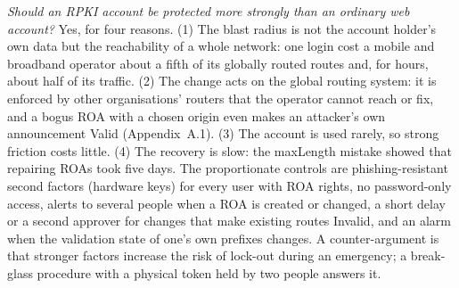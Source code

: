 \documentclass[11pt,a4paper]{article}
\begin{document}
\emph{Should an RPKI account be protected more strongly than an ordinary web account?} Yes, for four reasons. (1) The blast radius is not
the account holder's own data but the reachability of a whole network: one login cost a mobile and broadband operator about a fifth of its globally routed routes and, for hours, about half of its traffic. (2) The change acts on the global routing system: it is enforced by other organisations' routers that the operator cannot
reach or fix, and a bogus ROA with a chosen origin even makes an attacker's own announcement Valid (Appendix~A.1). (3) The account is used
rarely, so strong friction costs little. (4) The recovery is slow: the maxLength mistake showed that repairing ROAs took five days. The proportionate
controls are phishing-resistant second factors (hardware keys) for every user with ROA rights, no password-only access, alerts to several
people when a ROA is created or changed, a short delay or a second approver for changes that make existing routes Invalid, and an alarm
when the validation state of one's own prefixes changes. A counter-argument is that stronger factors increase the risk of lock-out during an
emergency; a break-glass procedure with a physical token held by two people answers it.
\end{document}

